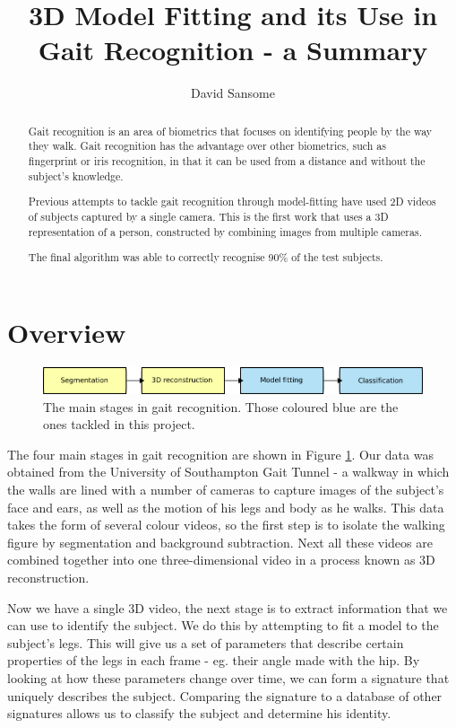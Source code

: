 \documentclass[a4paper,12pt]{article}
\title{3D Model Fitting and its Use in Gait Recognition - a Summary}
\author{David Sansome}
\begin{document}


\maketitle

\begin{abstract}
	Gait recognition is an area of biometrics that focuses on identifying people by the way they walk.
	Gait recognition has the advantage over other biometrics, such as fingerprint or iris recognition, in that it can be used from a distance and without the subject's knowledge.
	
	Previous attempts to tackle gait recognition through model-fitting have used 2D videos of subjects captured by a single camera.
	This is the first work that uses a 3D representation of a person, constructed by combining images from multiple cameras.
	
	The final algorithm was able to correctly recognise 90\% of the test subjects.
\end{abstract}

\tableofcontents


\newpage
\section{Overview}

\begin{figure}[b]
	\centering
	\includegraphics[width=12cm]{../report/overview.png}
	\caption{The main stages in gait recognition.
		Those coloured blue are the ones tackled in this project.}
	\label{OverviewBoxes}
\end{figure}

The four main stages in gait recognition are shown in Figure \ref{OverviewBoxes}.
Our data was obtained from the University of Southampton Gait Tunnel -
a walkway in which the walls are lined with a number of cameras to capture images of the subject's face and ears, as well as the motion of his legs and body as he walks.
This data takes the form of several colour videos, so the first step is to isolate the walking figure by segmentation and background subtraction.
Next all these videos are combined together into one three-dimensional video in a process known as 3D reconstruction.

Now we have a single 3D video, the next stage is to extract information that we can use to identify the subject.
We do this by attempting to fit a model to the subject's legs.
This will give us a set of parameters that describe certain properties of the legs in each frame - eg. their angle made with the hip.
By looking at how these parameters change over time, we can form a signature that uniquely describes the subject.
Comparing the signature to a database of other signatures allows us to classify the subject and determine his identity.
\end{document}
